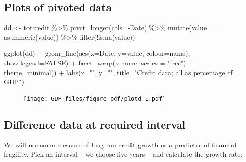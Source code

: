 \documentclass[
  letterpaper,
]{book}
\newenvironment{Shaded}{\begin{snugshade}}{\end{snugshade}}
\newcommand{\AttributeTok}[1]{\textcolor[rgb]{0.40,0.45,0.13}{#1}}
\newcommand{\ConstantTok}[1]{\textcolor[rgb]{0.56,0.35,0.01}{#1}}
\newcommand{\FunctionTok}[1]{\textcolor[rgb]{0.28,0.35,0.67}{#1}}
\newcommand{\NormalTok}[1]{\textcolor[rgb]{0.00,0.23,0.31}{#1}}
\newcommand{\OtherTok}[1]{\textcolor[rgb]{0.00,0.23,0.31}{#1}}
\newcommand{\SpecialCharTok}[1]{\textcolor[rgb]{0.37,0.37,0.37}{#1}}
\newcommand{\StringTok}[1]{\textcolor[rgb]{0.13,0.47,0.30}{#1}}
\begin{document}
\hypertarget{plots-of-pivoted-data}{%
\subsection{Plots of pivoted data}\label{plots-of-pivoted-data}}

\begin{Shaded}
\begin{Highlighting}[]
\NormalTok{dd }\OtherTok{\textless{}{-}}\NormalTok{ totcredit }\SpecialCharTok{\%\textgreater{}\%}
  \FunctionTok{pivot\_longer}\NormalTok{(}\AttributeTok{cols=}\SpecialCharTok{{-}}\NormalTok{Date) }\SpecialCharTok{\%\textgreater{}\%}
  \FunctionTok{mutate}\NormalTok{(}\AttributeTok{value =} \FunctionTok{as.numeric}\NormalTok{(value)) }\SpecialCharTok{\%\textgreater{}\%}
  \FunctionTok{filter}\NormalTok{(}\SpecialCharTok{!}\FunctionTok{is.na}\NormalTok{(value))}

\FunctionTok{ggplot}\NormalTok{(dd) }\SpecialCharTok{+} 
  \FunctionTok{geom\_line}\NormalTok{(}\FunctionTok{aes}\NormalTok{(}\AttributeTok{x=}\NormalTok{Date, }\AttributeTok{y=}\NormalTok{value, }\AttributeTok{colour=}\NormalTok{name), }\AttributeTok{show.legend=}\ConstantTok{FALSE}\NormalTok{) }\SpecialCharTok{+}
  \FunctionTok{facet\_wrap}\NormalTok{(}\SpecialCharTok{\textasciitilde{}}\NormalTok{ name, }\AttributeTok{scales =} \StringTok{"free"}\NormalTok{) }\SpecialCharTok{+} 
  \FunctionTok{theme\_minimal}\NormalTok{() }\SpecialCharTok{+}
  \FunctionTok{labs}\NormalTok{(}\AttributeTok{x=}\StringTok{""}\NormalTok{, }\AttributeTok{y=}\StringTok{""}\NormalTok{, }\AttributeTok{title=}\StringTok{"Credit data; all as percentage of GDP"}\NormalTok{)}
\end{Highlighting}
\end{Shaded}

\begin{figure}[H]

{\centering \texttt{[image: GDP\_files/figure-pdf/plotd-1.pdf]}

}

\end{figure}

\hypertarget{difference-data-at-required-interval}{%
\subsection{Difference data at required
interval}\label{difference-data-at-required-interval}}

We will use some measure of long run credit growth as a predictor of
financial fragility. Pick an interval -- we choose five years -- and
calculate the growth rate.
\end{document}
